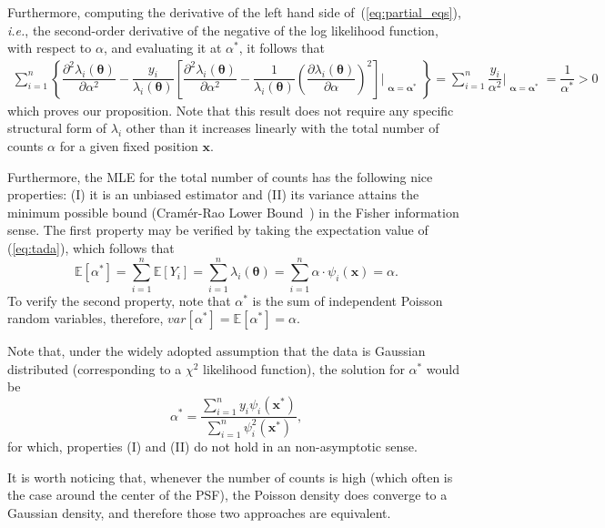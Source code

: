 \documentclass{rnaastex}
\begin{document}
Furthermore, computing the derivative of the left hand side of~(\ref{eq:partial_eqs}), \textit{i.e.}, the second-order derivative of the negative of the log likelihood function, with respect to $\alpha$, and evaluating it at $\alpha^{*}$, it follows that
\begin{align}
    \sum_{i=1}^{n}\left\{\dfrac{\partial^2 \lambda_i\left(\bm{\theta}\right)}{\partial \alpha^2}
    - \dfrac{y_i}{\lambda_i\left(\bm{\theta}\right)}\left[\dfrac{\partial^2 \lambda_i
    \left(\bm{\theta}\right)}{\partial \alpha^2} - \dfrac{1}{\lambda_i\left(\bm{\theta}\right)}
    \left(\dfrac{\partial \lambda_i\left(\bm{\theta}\right)}{\partial \alpha}\right)^2\right]\Bigr|_{\substack{\bm{\alpha}=\bm{\alpha}^{*}}}\right\} = \sum_{i=1}^{n}\dfrac{y_i}{\alpha^2}\Bigr|_{\substack{\bm{\alpha}=\bm{\alpha}^{*}}} = \dfrac{1}{\alpha^{*}} > 0
    \label{eq:partial2_eqs}
\end{align}
which proves our proposition. Note that this result does not require any specific structural form of $\lambda_i$ other than it increases linearly with the total number of counts $\alpha$ for a given fixed position $\bm{x}$.

Furthermore, the MLE for the total number of counts has the following nice properties: (\textrm{I}) it is an unbiased estimator and (\textrm{II}) its variance attains the minimum possible bound (Cram\'er-Rao Lower Bound~\citep{bobrovsky:1987}) in the Fisher information sense. The first property may be verified by taking the expectation value of (\ref{eq:tada}), which follows that
\begin{equation}
    \mathbb{E}\left[\alpha^{*}\right] = \sum_{i=1}^{n}\mathbb{E}[Y_i] = \sum_{i=1}^{n} \lambda_i(\bm{\theta}) = \sum_{i=1}^{n} \alpha\cdot\psi_i(\bm{x}) = \alpha.
\end{equation}
To verify the second property, note that $\alpha^{*}$ is the sum of independent Poisson random variables, therefore, $var\left[\alpha^{*}\right] = \mathbb{E}\left[\alpha^{*}\right] = \alpha$.

Note that, under the widely adopted assumption that the data is Gaussian distributed (corresponding to a $\chi^2$ likelihood function), the solution for $\alpha^{*}$ would be
\begin{equation}
    \alpha^{*} = \dfrac{\sum_{i=1}^{n}y_i \psi_i(\bm{x}^{*})}{\sum_{i=1}^{n}\psi^2_i(\bm{x}^{*})},
\end{equation}
for which, properties (I) and (II) do not hold in an non-asymptotic sense.

It is worth noticing that, whenever the number of counts is high (which often is the case around the center of the PSF), the Poisson density does converge to a Gaussian density, and therefore those two approaches are equivalent.
\end{document}
